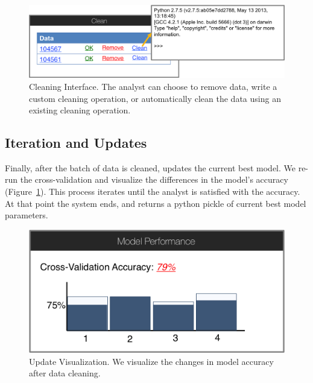 \begin{figure}[t]
\centering
 \includegraphics[width=\columnwidth]{figs/interface4.png}
 \caption{Cleaning Interface. The analyst can choose to remove data, write a custom cleaning operation, or automatically clean the data using an existing cleaning operation.}
\end{figure}

\subsection{Iteration and Updates}
Finally, after the batch of data is cleaned, \sys updates the current best model.
We re-run the cross-validation and visualize the differences in the model's accuracy (Figure~\ref{modelacc}).
This process iterates until the analyst is satisfied with the accuracy.
At that point the system ends, and returns a python pickle of current best model parameters.


\begin{figure}[t]
\centering
 \includegraphics[width=0.6\columnwidth]{figs/interface5.png}
 \caption{Update Visualization. We visualize the changes in model accuracy after data cleaning.}\label{modelacc}
\end{figure}